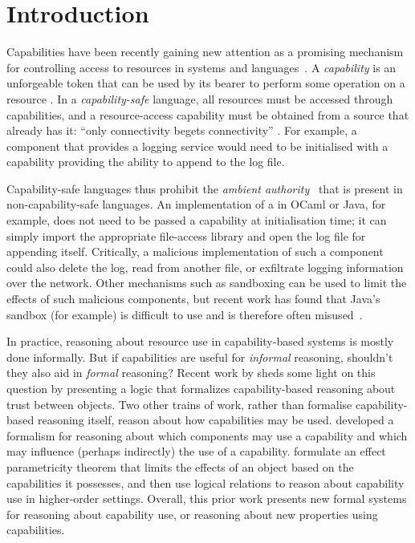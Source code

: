 \section{Introduction}

Capabilities have been recently gaining new attention as a promising mechanism for controlling access to resources in systems and languages~\cite{miller03,drossopoulou07,dimoulas14,devriese16}.
A \textit{capability} is an unforgeable token that can be used by its bearer to perform some operation on a resource \cite{dennis66}.
In a \textit{capability-safe} language, all resources must be accessed through capabilities, and a resource-access capability must be obtained from a source that already has it: ``only connectivity begets connectivity'' \cite{miller03}.
For example, a  component that provides a logging service would need to be initialised with a capability providing the ability to append to the log file.

Capability-safe languages thus prohibit the \textit{ambient authority}~\cite{miller06} that is present in non-capability-safe languages.
An implementation of a  in OCaml or Java, for example, does not need to be passed a capability at initialisation time; it can simply import the appropriate file-access library and open the log file for appending itself.
Critically, a malicious implementation of such a component could also delete the log, read from another file, or exfiltrate logging information over the network.
Other mechanisms such as sandboxing can be used to limit the effects of such malicious components, but recent work has found that Java's sandbox (for example) is difficult to use and is therefore often misused~\cite{coker15, maass16}.

In practice, reasoning about resource use in capability-based systems is mostly done informally.
But if capabilities are useful for \textit{informal} reasoning, shouldn't they also aid in \textit{formal} reasoning?
Recent work by \citet{drossopoulou07} sheds some light on this question by presenting a logic that formalizes capability-based reasoning about trust between objects.
Two other trains of work, rather than formalise capability-based reasoning itself, reason about how capabilities may be used.
\citet{dimoulas14} developed a formalism for reasoning about which components may use a capability and which may influence (perhaps indirectly) the use of a capability.
\citet{devriese16} formulate an effect parametricity theorem that limits the effects of an object based on the capabilities it possesses, and then use logical relations to reason about capability use in higher-order settings.
Overall, this prior work presents new formal systems for reasoning about capability use, or reasoning about new properties using capabilities.

